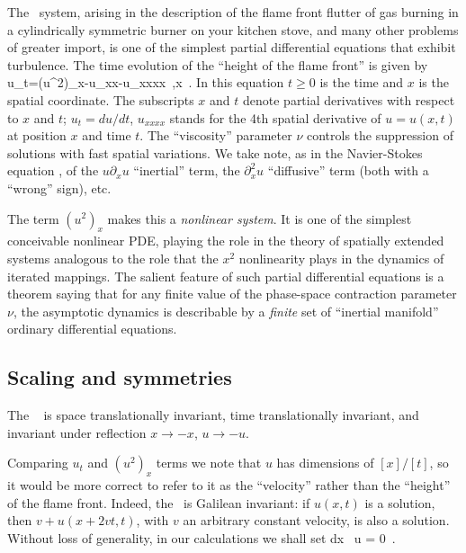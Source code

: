 
The \KS\ system,
arising in the description of the flame front flutter of  gas burning in
a cylindrically symmetric burner on your kitchen stove,
and many other problems of greater import,
is one of the simplest partial differential equations that
exhibit turbulence.
The time evolution of the ``height of the flame front'' 
is given by
\beq
u_t=(u^2)_x-u_{xx}-\nu u_{xxxx}
\,,\qquad	x \in [0,L]
\,.
In this equation $t \geq 0$ is the time and
$x$ is the spatial coordinate.
The subscripts $x$ and $t$ denote partial derivatives with respect to
$x$ and $t$;
$u_t = du/dt$, $u_{xxxx}$ stands for the 4th spatial
derivative of 
$u=u(x,t)$ at position $x$ and time $t$.
The ``viscosity'' parameter 
$\nu$ controls the 
suppression of solutions with fast spatial variations.
We take note, as in the Navier-Stokes equation , of the
$u {\partial_x} u$ ``inertial'' term, the $ {\partial_x^2 } u$
``diffusive'' term (both with a ``wrong'' sign), etc.

The term $(u^2)_x$ makes this a {\em nonlinear system}.
It is one of the
simplest conceivable nonlinear PDE, playing
the role in the theory of spatially extended systems
analogous to the role that
the $x^2$ nonlinearity
plays in the dynamics of iterated mappings.
The salient feature of such
partial differential equations is a theorem saying that
for any finite value of the phase-space contraction
parameter $\nu$,  the asymptotic dynamics is
describable by a {\em finite} set of ``inertial manifold''
ordinary differential equations. %


\subsection{Scaling and symmetries}

The \KSe\  is space translationally invariant,
time translationally invariant, and invariant under
reflection
$x \to -x$, 
$u \to -u$. 

Comparing $u_t$ and $(u^2)_x$ terms we note that $u$ has
dimensions of $[x]/[t]$, so it would be more correct to
refer to it as the ``velocity'' rather than the 
``height'' of the flame front. Indeed, the  \KSe\ is
Galilean invariant: if $u(x,t)$ is a solution, then 
$v+u(x+2vt,t)$, with $v$ an arbitrary constant velocity, is also a solution. 
Without loss of generality, in our calculations we shall set 
\beq
\int dx \, u = 0
\,.


